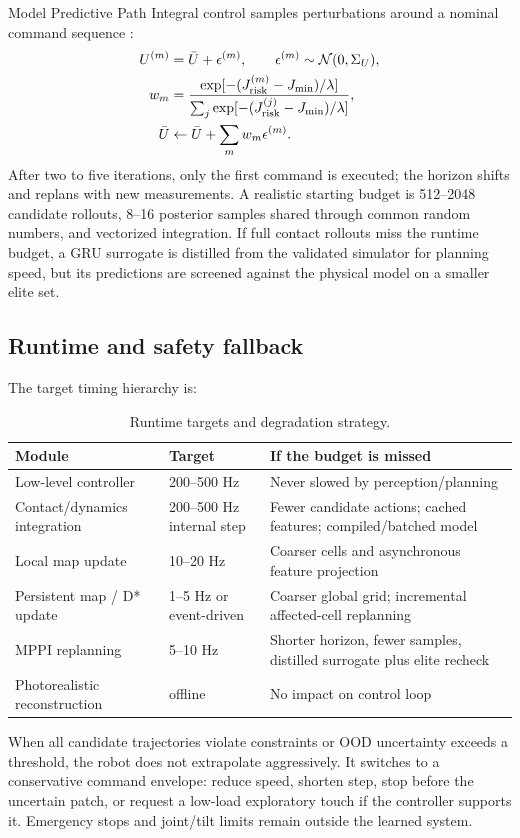 Model Predictive Path Integral control samples perturbations around a nominal command sequence \citep{williams2018mppi}:
\begin{align}
U^{(m)}&=\bar U+\epsilon^{(m)},\qquad \epsilon^{(m)}\sim\mathcal{N}(0,\Sigma_U),\\
w_m&=\frac{\exp[-(J_{\mathrm{risk}}^{(m)}-J_{\min})/\lambda]}{\sum_j\exp[-(J_{\mathrm{risk}}^{(j)}-J_{\min})/\lambda]},\\
\bar U&\leftarrow \bar U+\sum_m w_m\epsilon^{(m)}.
\label{eq:mppi}
\end{align}
After two to five iterations, only the first command is executed; the horizon shifts and replans with new measurements. A realistic starting budget is 512--2048 candidate rollouts, 8--16 posterior samples shared through common random numbers, and vectorized integration. If full contact rollouts miss the runtime budget, a GRU surrogate is distilled from the validated simulator for planning speed, but its predictions are screened against the physical model on a smaller elite set.

\subsection{Runtime and safety fallback}

The target timing hierarchy is:
\begin{table}[ht]
\centering
\caption{Runtime targets and degradation strategy.}
\label{tab:runtime}
\begin{tabularx}{\textwidth}{@{}L{35mm}L{30mm}Y@{}}
\toprule
\textbf{Module} & \textbf{Target} & \textbf{If the budget is missed}\\
\midrule
Low-level controller & 200--500 Hz & Never slowed by perception/planning\\
Contact/dynamics integration & 200--500 Hz internal step & Fewer candidate actions; cached features; compiled/batched model\\
Local map update & 10--20 Hz & Coarser cells and asynchronous feature projection\\
Persistent map / D* update & 1--5 Hz or event-driven & Coarser global grid; incremental affected-cell replanning\\
MPPI replanning & 5--10 Hz & Shorter horizon, fewer samples, distilled surrogate plus elite recheck\\
Photorealistic reconstruction & offline & No impact on control loop\\
\bottomrule
\end{tabularx}
\end{table}

When all candidate trajectories violate constraints or OOD uncertainty exceeds a threshold, the robot does not extrapolate aggressively. It switches to a conservative command envelope: reduce speed, shorten step, stop before the uncertain patch, or request a low-load exploratory touch if the controller supports it. Emergency stops and joint/tilt limits remain outside the learned system.
